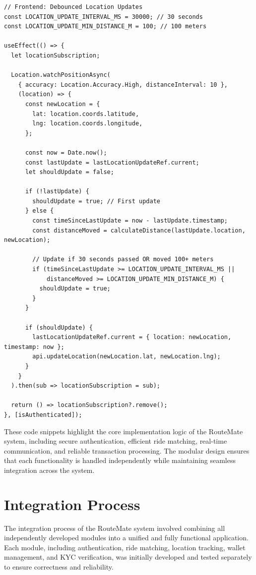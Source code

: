 \documentclass[10pt,a4paper]{report}
\begin{document}
\begin{verbatim}
// Frontend: Debounced Location Updates
const LOCATION_UPDATE_INTERVAL_MS = 30000; // 30 seconds
const LOCATION_UPDATE_MIN_DISTANCE_M = 100; // 100 meters

useEffect(() => {
  let locationSubscription;
  
  Location.watchPositionAsync(
    { accuracy: Location.Accuracy.High, distanceInterval: 10 },
    (location) => {
      const newLocation = {
        lat: location.coords.latitude,
        lng: location.coords.longitude,
      };
      
      const now = Date.now();
      const lastUpdate = lastLocationUpdateRef.current;
      let shouldUpdate = false;
      
      if (!lastUpdate) {
        shouldUpdate = true; // First update
      } else {
        const timeSinceLastUpdate = now - lastUpdate.timestamp;
        const distanceMoved = calculateDistance(lastUpdate.location, newLocation);
        
        // Update if 30 seconds passed OR moved 100+ meters
        if (timeSinceLastUpdate >= LOCATION_UPDATE_INTERVAL_MS ||
            distanceMoved >= LOCATION_UPDATE_MIN_DISTANCE_M) {
          shouldUpdate = true;
        }
      }
      
      if (shouldUpdate) {
        lastLocationUpdateRef.current = { location: newLocation, timestamp: now };
        api.updateLocation(newLocation.lat, newLocation.lng);
      }
    }
  ).then(sub => locationSubscription = sub);

  return () => locationSubscription?.remove();
}, [isAuthenticated]);
\end{verbatim}

\justify\large These code snippets highlight the core implementation logic of the RouteMate system, including secure authentication, efficient ride matching, real-time communication, and reliable transaction processing. The modular design ensures that each functionality is handled independently while maintaining seamless integration across the system.

\section{Integration Process}

\justify\large The integration process of the RouteMate system involved combining all independently developed modules into a unified and fully functional application. Each module, including authentication, ride matching, location tracking, wallet management, and KYC verification, was initially developed and tested separately to ensure correctness and reliability.
\end{document}
